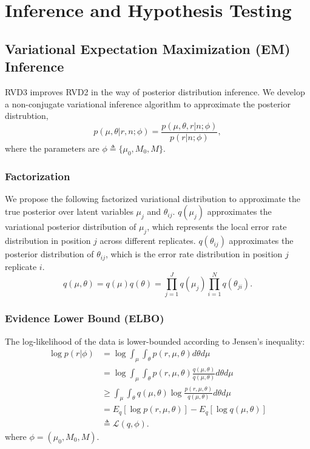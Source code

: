 \documentclass{article}
\begin{document}
\section{Inference and Hypothesis Testing}
\subsection{Variational Expectation Maximization (EM) Inference}
RVD3 improves RVD2 in the way of posterior distribution inference. We develop a non-conjugate variational inference algorithm to approximate the posterior distrubtion, 
\begin{equation}
	p(\mu, \theta | r, n; \phi)  = \frac{ p(\mu, \theta, r | n; \phi) } {p ( r | n; \phi)},
\end{equation}
where the parameters are $\phi \triangleq \{\mu_0, M_0, M\}$.
\subsubsection{Factorization}
We propose the following factorized variational distribution to approximate the true posterior over latent variables $\mu_j$ and $\theta_{ij}$. $q(\mu_j)$ approximates the variational posterior distribution of $\mu_j$, which represents the local error rate distribution in position $j$ across different replicates.
$q(\theta_{ij})$ approximates the posterior distribution of $\theta_{ij}$, which is the error rate distribution in position $j$ replicate $i$.
\begin{equation}
  q(\mu, \theta) = q(\mu)q(\theta) = \prod_{j=1}^J q(\mu_{j}) \prod_{i=1}^N q(\theta_{ji}).
  \label{eq:vardist}
\end{equation}

\subsubsection{Evidence Lower Bound (ELBO)}
The log-likelihood of the data is lower-bounded according to Jensen's inequality:
\begin{equation}
\begin{split}
\log p \left( r | \phi \right) &= \log \int_\mu \int_\theta p\left(r,\mu,\theta \right) d\theta d\mu \\
&= \log \int_\mu \int_\theta p\left(r,\mu,\theta \right)\frac{q\left(\mu,\theta \right) }{q\left(\mu,\theta \right) } d\theta d\mu \\
&\geq \int_\mu \int_\theta q\left(\mu,\theta \right) \log \frac{ p\left(r,\mu,\theta \right)}{q\left(\mu,\theta \right)} d\theta d\mu \\
&= E_q \left[ \log p\left(r,\mu,\theta \right)\right] - E_q \left[ \log q\left(\mu,\theta \right)\right] \\
&\triangleq \mathcal{L}(q, \phi).
\end{split}
\end{equation}
where $ \phi= \left( \mu_0, M_0, M \right) $.
\end{document}
